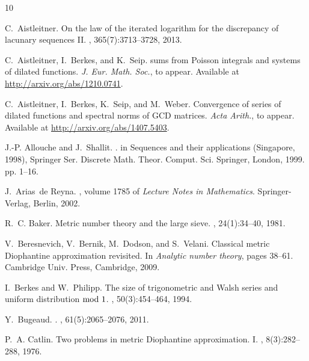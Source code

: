 \documentclass[12pt]{amsart}
\begin{document}
\def\cprime{$'$}
\begin{thebibliography}{10}

C.~Aistleitner.
\newblock On the law of the iterated logarithm for the discrepancy of lacunary
  sequences {II}.
, 365(7):3713--3728, 2013.

C.~Aistleitner, I.~Berkes, and K.~Seip.
 sums from {P}oisson integrals and systems of dilated
  functions.
\newblock \emph{J. Eur. Math. Soc.}, to appear. Available at
  \url{http://arxiv.org/abs/1210.0741}.

C.~Aistleitner, I.~Berkes, K.~Seip, and M.~Weber.
\newblock Convergence of series of dilated functions and spectral norms of
  {G}{C}{D} matrices.
\newblock \emph{Acta Arith.}, to appear. Available at
  \url{http://arxiv.org/abs/1407.5403}.

J.-P. Allouche and J.~Shallit.
.
\newblock in Sequences and their applications (Singapore, 1998), Springer Ser.
  Discrete Math. Theor. Comput. Sci. Springer, London, 1999.
\newblock pp. 1--16.

J.~Arias~de Reyna.
, volume 1785 of {\em
  Lecture Notes in Mathematics}.
\newblock Springer-Verlag, Berlin, 2002.

R.~C. Baker.
\newblock Metric number theory and the large sieve.
, 24(1):34--40, 1981.

V.~Beresnevich, V.~Bernik, M.~Dodson, and S.~Velani.
\newblock Classical metric {D}iophantine approximation revisited.
\newblock In {\em Analytic number theory}, pages 38--61. Cambridge Univ. Press,
  Cambridge, 2009.

I.~Berkes and W.~Philipp.
\newblock The size of trigonometric and {W}alsh series and uniform distribution
  {${\rm mod}\ 1$}.
, 50(3):454--464, 1994.

Y.~Bugeaud.
.
, 61(5):2065--2076, 2011.

P.~A. Catlin.
\newblock Two problems in metric {D}iophantine approximation. {I}.
, 8(3):282--288, 1976.


\end{thebibliography}
\end{document}
